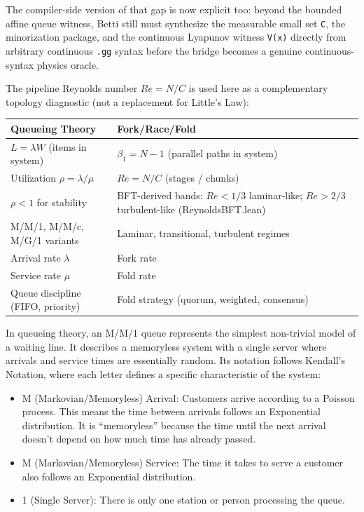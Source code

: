 \documentclass[
  11pt,
]{article}
\newcounter{none} %
\begin{document}
The compiler-side version of that gap is now explicit too: beyond the
bounded affine queue witness, Betti still must synthesize the measurable
small set \texttt{C}, the minorization package, and the continuous
Lyapunov witness \texttt{V(x)} directly from arbitrary continuous
\texttt{.gg} syntax before the bridge becomes a genuine
continuous-syntax physics oracle.

The pipeline Reynolds number \(Re = N/C\) is used here as a
complementary topology diagnostic (not a replacement for Little's Law):

{\def\LTcaptype{none} %
\begin{longtable}[]{@{}
  >{\raggedright\arraybackslash}p{}
  >{\raggedright\arraybackslash}p{}@{}}
\toprule\noalign{}
\begin{minipage}[b]{\linewidth}\raggedright
Queueing Theory
\end{minipage} & \begin{minipage}[b]{\linewidth}\raggedright
Fork/Race/Fold
\end{minipage} \\
\midrule\noalign{}
\endhead
\bottomrule\noalign{}
\endlastfoot
\(L = \lambda W\) (items in system) & \(\beta_1 = N - 1\) (parallel
paths in system) \\
Utilization \(\rho = \lambda/\mu\) & \(Re = N/C\) (stages / chunks) \\
\(\rho < 1\) for stability & BFT-derived bands: \(Re < 1/3\)
laminar-like; \(Re > 2/3\) turbulent-like (ReynoldsBFT.lean) \\
M/M/1, M/M/c, M/G/1 variants & Laminar, transitional, turbulent
regimes \\
Arrival rate \(\lambda\) & Fork rate \\
Service rate \(\mu\) & Fold rate \\
Queue discipline (FIFO, priority) & Fold strategy (quorum, weighted,
consensus) \\
\end{longtable}
}

In queueing theory, an M/M/1 queue represents the simplest non-trivial
model of a waiting line. It describes a memoryless system with a single
server where arrivals and service times are essentially random. Its
notation follows Kendall's Notation, where each letter defines a
specific characteristic of the system:

\begin{itemize}
\item
  M (Markovian/Memoryless) Arrival: Customers arrive according to a
  Poisson process. This means the time between arrivals follows an
  Exponential distribution. It is ``memoryless'' because the time until
  the next arrival doesn't depend on how much time has already passed.
\item
  M (Markovian/Memoryless) Service: The time it takes to serve a
  customer also follows an Exponential distribution.
\item
  1 (Single Server): There is only one station or person processing the
  queue.
\end{itemize}
\end{document}
